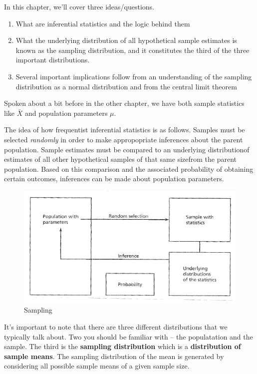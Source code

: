 \documentclass[]{book}
\providecommand{\tightlist}{%
  \setlength{\itemsep}{0pt}\setlength{\parskip}{0pt}}
\theoremstyle{definition}
\theoremstyle{definition}
\theoremstyle{definition}
\theoremstyle{remark}
\begin{document}
In this chapter, we'll cover three ideas/questions.

\begin{enumerate}
\def\labelenumi{\arabic{enumi}.}
\tightlist
\item
  What are inferential statistics and the logic behind them
\item
  What the underlying distribution of all hypothetical sample estimates
  is known as the sampling distribution, and it constitutes the third of
  the three important distributions.
\item
  Several important implications follow from an understanding of the
  sampling distribution as a normal distribution and from the central
  limit theorem
\end{enumerate}

Spoken about a bit before in the other chapter, we have both sample
statistics like \(\bar{X}\) and population parameters \(\mu\).

The idea of how frequentist inferential statistics is as follows.
Samples must be selected \emph{randomly} in order to make appropopriate
inferences about the parent population. Sample estimates must be
compared to an underlying distributionof estimates of all other
hypothetical samples of that same sizefrom the parent population. Based
on this comparison and the associated probability of obtaining certain
outcomes, inferences can be made about population parameters.

\begin{figure}
\centering
\includegraphics{img/hickssampling1.png}
\caption{Sampling}
\end{figure}

It's important to note that there are three different distributions that
we typically talk about. Two you should be familiar with -- the
populatation and the sample. The third is the \textbf{sampling
distribution} which is a \textbf{distribution of sample means}. The
sampling distribution of the mean is generated by considering all
possible sample means of a given sample size.
\end{document}

